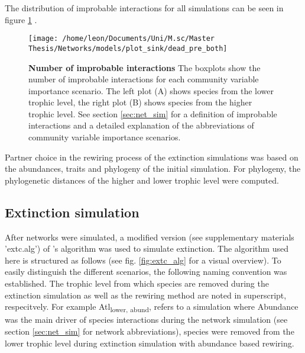 \documentclass[12pt,a4paper]{article}
\begin{document}
	 
The distribution of improbable interactions for all simulations can be seen in figure \ref{fig:dead_int} . 

\begin{figure}[H]
	 \texttt{[image: /home/leon/Documents/Uni/M.sc/Master Thesis/Networks/models/plot\_sink/dead\_pre\_both]}
	 \caption{\textbf{Number of improbable interactions} The boxplots show the number of improbable interactions for each community variable importance scenario.
	 The left plot (A) shows species from the lower trophic level, the right plot (B) shows species from the higher trophic level. See section \ref{sec:net_sim} for a definition of improbable interactions and a detailed explanation of the abbreviations of community variable importance scenarios.}
	 \label{fig:dead_int}
\end{figure}



	Partner choice in the rewiring process of the extinction simulations was based on the abundances, traits and phylogeny of the initial simulation. For phylogeny, the phylogenetic distances of the higher and lower trophic level were computed.
	\subsection{Extinction simulation} \label{sec:extc_sim}
	After networks were simulated, a modified version (see supplementary materials 'extc.alg') of \citeauthor{Vizentin-Bugoni2019}'s algorithm was used to simulate extinction. The algorithm used here is structured as follows (see fig. \ref{fig:extc_alg} for a visual overview). To easily distinguish the different scenarios, the following naming convention was established. The trophic level from which species are removed during the extinction simulation as well as the rewiring method are noted in superscript, respecitvely. For example Atl\textsubscript{lower, abund}, refers to a simulation where Abundance was the main driver of species interactions during the network simulation (see section \ref{sec:net_sim} for network abbreviations), species were removed from the lower trophic level during extinction simulation with abundance based rewiring.
\end{document}

